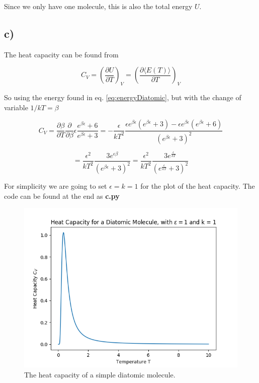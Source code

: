 \documentclass[a4paper,norsk, 10pt]{article}
\newcommand{\pd}[2]{\frac{\partial #1}{\partial #2}}
\begin{document}
Since we only have one molecule, this is also the total energy $U$.

\subsection{c)}

The heat capacity can be found from 

\begin{equation}
C_V = \left(\pd{U}{T}\right)_V = \left(\pd{\langle E(T) \rangle }{T}\right)_V
\end{equation}\label{eq:heatCap}

So using the energy found in eq. \eqref{eq:energyDiatomic}, but with the change of variable $1/kT = \beta$

\begin{equation}
C_V = \pd{\beta}{T}\pd{}{\beta} \epsilon\frac{e^{\beta\epsilon} + 6}{e^{\beta\epsilon} +3} = -\frac{\epsilon}{kT^2}\frac{\epsilon e^{\beta\epsilon}\left(e^{\beta\epsilon} +3\right) - \epsilon e^{\beta\epsilon}\left(e^{\beta\epsilon} +6\right)}{\left(e^{\beta\epsilon} +3\right)^2}
\end{equation}

\begin{equation}
= \frac{\epsilon^2}{kT^2}\frac{3e^{\epsilon\beta}}{\left(e^{\beta\epsilon} +3\right)^2} = \frac{\epsilon^2}{kT^2}\frac{3e^{\frac{\epsilon}{kT}}}{\left(e^{\frac{\epsilon}{kT}} +3\right)^2}
\end{equation}

For simplicity we are going to set $\epsilon = k = 1$ for the plot of the heat capacity. The code can be found at the end as \textbf{c.py}

\begin{figure}[H]
\centering
\includegraphics[scale=0.5]{c_v_c.png}
\caption{The heat capacity of a simple diatomic molecule.}
\end{figure}
\end{document}
